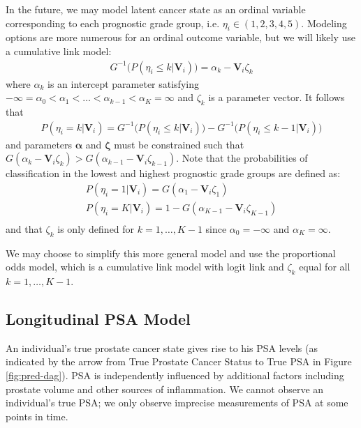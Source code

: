 \documentclass[12pt, letterpaper]{article}
\newcommand{\bmalpha}{\boldsymbol{\alpha}}
\newcommand{\bmzeta}{\boldsymbol{\zeta}}
\newcommand{\bmV}{\mathbf{V}}
\newcommand{\beas}{\begin{eqnarray*}}
\newcommand{\eeas}{\end{eqnarray*}}
\begin{document}
In the future, we may model latent cancer state as an ordinal variable corresponding to each prognostic grade group, i.e. $\eta_i \in (1,2,3,4,5)$. Modeling options are more numerous for an ordinal outcome variable, but we will likely use a cumulative link model:
\beas
G^{-1}\big(P(\eta_i \leq k | \bmV_i)\big) =  \alpha_k - \bmV_i\zeta_k
\eeas
where $\alpha_k$ is an intercept parameter satisfying $-\infty=\alpha_0<\alpha_1<\dots<\alpha_{k-1}<\alpha_K=\infty$ and $\zeta_k$ is a parameter vector. It follows that 
\beas
P(\eta_i=k|\bmV_i) = G^{-1}\big(P(\eta_i \leq k | \bmV_i)\big) - G^{-1}\big(P(\eta_i \leq k-1 | \bmV_i)\big)
\eeas
and parameters $\bmalpha$ and $\bmzeta$ must be constrained such that $G(\alpha_k - \bmV_i\zeta_k) > G(\alpha_{k-1} - \bmV_i\zeta_{k-1})$. Note that the probabilities of classification in the lowest and highest prognostic grade groups are defined as:
\beas
P(\eta_i=1|\bmV_i) = G(\alpha_1-\bmV_i\zeta_1)\\
P(\eta_i=K|\bmV_i) = 1-G(\alpha_{K-1}-\bmV_i\zeta_{K-1})\\
\eeas
and that $\zeta_k$ is only defined for $k=1,\dots,K-1$ since $\alpha_0=-\infty$ and $\alpha_K=\infty$. 

We may choose to simplify this more general model and use the proportional odds model, which is a cumulative link model with logit link and $\zeta_k$ equal for all $k=1,\dots,K-1$.

\subsection{Longitudinal PSA Model}
An individual's true prostate cancer state gives rise to his PSA levels (as indicated by the arrow from True Prostate Cancer Status to True PSA in Figure \ref{fig:pred-dag}). PSA is independently influenced by additional factors including prostate volume and other sources of inflammation. We cannot observe an individual's true PSA; we only observe imprecise measurements of PSA at some points in time.
\end{document}

